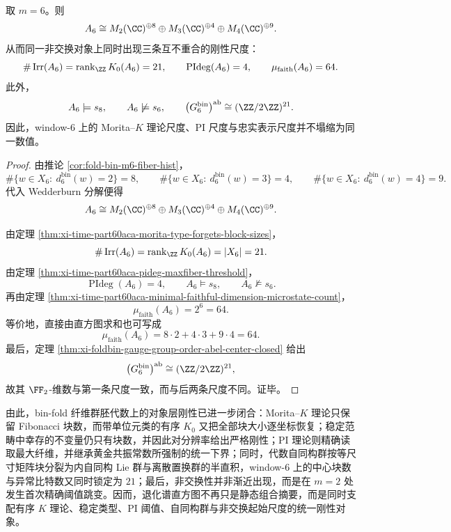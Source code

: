 \begin{theorem}\label{thm:xi-time-part60aca-window6-triple-rigidity-scales}
取 \(m=6\)。则
\[
A_6
\cong
M_2(\CC)^{\oplus 8}\oplus M_3(\CC)^{\oplus 4}\oplus M_4(\CC)^{\oplus 9}.
\]
从而同一非交换对象上同时出现三条互不重合的刚性尺度：
\[
\#\operatorname{Irr}(A_6)
=
\operatorname{rank}_{\ZZ}K_0(A_6)
=
21,
\qquad
\operatorname{PIdeg}(A_6)=4,
\qquad
\mu_{\mathrm{faith}}(A_6)=64.
\]
此外，
\[
A_6\models s_8,
\qquad
A_6\not\models s_6,
\qquad
\bigl(G_6^{\mathrm{bin}}\bigr)^{\mathrm{ab}}\cong (\ZZ/2\ZZ)^{21}.
\]
因此，window-\(6\) 上的 Morita--\(K\) 理论尺度、PI 尺度与忠实表示尺度并不塌缩为同一数值。
\end{theorem}
\begin{proof}
由推论 \ref{cor:fold-bin-m6-fiber-hist}，
\[
\#\{w\in X_6:\ d_6^{\mathrm{bin}}(w)=2\}=8,
\qquad
\#\{w\in X_6:\ d_6^{\mathrm{bin}}(w)=3\}=4,
\qquad
\#\{w\in X_6:\ d_6^{\mathrm{bin}}(w)=4\}=9.
\]
代入 Wedderburn 分解便得
\[
A_6
\cong
M_2(\CC)^{\oplus 8}\oplus M_3(\CC)^{\oplus 4}\oplus M_4(\CC)^{\oplus 9}.
\]

由定理 \ref{thm:xi-time-part60aca-morita-type-forgets-block-sizes}，
\[
\#\operatorname{Irr}(A_6)
=
\operatorname{rank}_{\ZZ}K_0(A_6)
=
|X_6|
=
21.
\]
由定理 \ref{thm:xi-time-part60aca-pideg-maxfiber-threshold}，
\[
\operatorname{PIdeg}(A_6)=4,
\qquad
A_6\models s_8,
\qquad
A_6\not\models s_6.
\]
再由定理 \ref{thm:xi-time-part60aca-minimal-faithful-dimension-microstate-count}，
\[
\mu_{\mathrm{faith}}(A_6)=2^6=64.
\]
等价地，直接由直方图求和也可写成
\[
\mu_{\mathrm{faith}}(A_6)
=
8\cdot 2+4\cdot 3+9\cdot 4
=
64.
\]
最后，定理 \ref{thm:xi-foldbin-gauge-group-order-abel-center-closed} 给出
\[
\bigl(G_6^{\mathrm{bin}}\bigr)^{\mathrm{ab}}\cong (\ZZ/2\ZZ)^{21},
\]
故其 \(\FF_2\)-维数与第一条尺度一致，而与后两条尺度不同。证毕。
\end{proof}



\noindent
由此，bin-fold 纤维群胚代数上的对象层刚性已进一步闭合：Morita--\(K\) 理论只保留 Fibonacci 块数，而带单位元类的有序 \(K_0\) 又把全部块大小逐坐标恢复；稳定范畴中幸存的不变量仍只有块数，并因此对分辨率给出严格刚性；PI 理论则精确读取最大纤维，并继承黄金共振常数所强制的统一下界；同时，代数自同构群按等尺寸矩阵块分裂为内自同构 Lie 群与离散置换群的半直积，window-\(6\) 上的中心块数与异常比特数又同时锁定为 \(21\)；最后，非交换性并非渐近出现，而是在 \(m=2\) 处发生首次精确阈值跳变。因而，退化谱直方图不再只是静态组合摘要，而是同时支配有序 \(K\) 理论、稳定类型、PI 阈值、自同构群与非交换起始尺度的统一刚性对象。

\endinput

